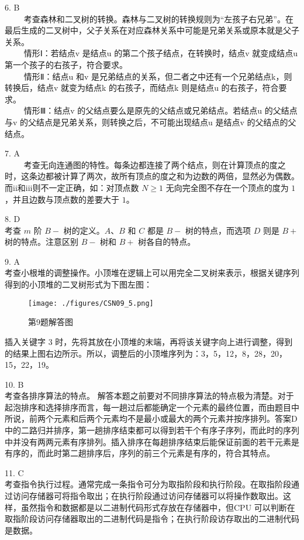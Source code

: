6. B \\
$\qquad$ 考查森林和二叉树的转换。森林与二叉树的转换规则为“左孩子右兄弟”。在最后生成的二叉树中，父子关系在对应森林关系中可能是兄弟关系或原本就是父子关系。 \\
$\qquad$ 情形Ⅰ：若结点v 是结点u 的第二个孩子结点，在转换时，结点v 就变成结点u 第一个孩子的右孩子，符合要求。 \\
$\qquad$ 情形Ⅱ：结点u 和v 是兄弟结点的关系，但二者之中还有一个兄弟结点k，则转换后，结点v 就变为结点k 的右孩子，而结点k 则是结点u 的右孩子，符合要求。 \\
$\qquad$ 情形Ⅲ：结点v 的父结点要么是原先的父结点或兄弟结点。若结点u 的父结点与v 的父结点是兄弟关系，则转换之后，不可能出现结点u 是结点v 的父结点的父结点。

7. A \\
$\qquad$ 考查无向连通图的特性。每条边都连接了两个结点，则在计算顶点的度之时，这条边都被计算了两次，故所有顶点的度之和为边数的两倍，显然必为偶数。而ii和iii则不一定正确，如：对顶点数 $N\geqslant1$ 无向完全图不存在一个顶点的度为 $1$，并且边数与顶点数的差要大于 $1$。

8. D \\
考查 $m$ 阶 $B-$ 树的定义。$A$、$B$ 和 $C$ 都是 $B-$ 树的特点，而选项 $D$ 则是 $B+$ 树的特点。注意区别 $B-$ 树和 $B+$ 树各自的特点。

9. A \\
考查小根堆的调整操作。小顶堆在逻辑上可以用完全二叉树来表示，根据关键序列得到的小顶堆的二叉树形式为下图左图：
\begin{figure}[ht]
\centering
\texttt{[image: ./figures/CSN09\_5.png]}
\caption{第9题解答图} \label{CSN09_fig5}
\end{figure}
插入关键字 3 时，先将其放在小顶堆的末端，再将该关键字向上进行调整，得到的结果上图右边所示。所以，调整后的小顶堆序列为：3，5，12，8，28，20，15，22，19。

10. B \\
考查各排序算法的特点。
解答本题之前要对不同排序算法的特点极为清楚。对于起泡排序和选择排序而言，每一趟过后都能确定一个元素的最终位置，而由题目中所说，前两个元素和后两个元素均不是最小或最大的两个元素并按序排列。答案D 中的二路归并排序，第一趟排序结束都可以得到若干个有序子序列，而此时的序列中并没有两两元素有序排列。插入排序在每趟排序结束后能保证前面的若干元素是有序的，而此时第二趟排序后，序列的前三个元素是有序的，符合其特点。

11. C \\
考查指令执行过程。通常完成一条指令可分为取指阶段和执行阶段。在取指阶段通过访问存储器可将指令取出；在执行阶段通过访问存储器可以将操作数取出。这样，虽然指令和数据都是以二进制代码形式存放在存储器中，但CPU 可以判断在取指阶段访问存储器取出的二进制代码是指令；在执行阶段访存取出的二进制代码是数据。

